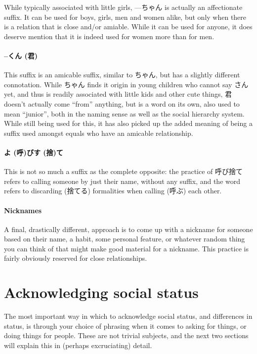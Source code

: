\documentclass[11pt, b5paper, twoside, openright, onecolumn]{book}
\makeatletter
\newcommand*{\rubystack}[2]{{\relscale{0.5}%
  \begin{tabular}[b]{@{}c@{}}%
    {#1}\\%
   {\textscale{2}{#2}}%
  \end{tabular}}%
}
\DeclareRobustCommand*{\ruby}[2]{%
  \mbox{%
    \setlength{\parskip}{0ex}%
    \BeginAccSupp{method=pdfstringdef,ActualText={#1}}%
      \rubystack{\phantom{#2}}{#1}%
      \llap{%
        \rubystack{#2}{\phantom{#1}}%
      }%
    \EndAccSupp{}%
  }%
}
\renewcommand*{\ruby}[2]{#2 (#1)}%
\makeatother
\begin{document}
While typically associated with little girls‚ —ちゃん is actually an affectionate suffix. It can be used for boys‚ girls‚ men and women alike‚ but only when there is a relation that is close and/or amiable. While it  can be used for anyone‚ it does deserve mention that it is indeed used for women more than for men.

\paragraph{–\ruby{君}{くん}}

This suffix is an amicable suffix‚ similar to ちゃん‚ but has a slightly different connotation. While ちゃん finds it origin in young children who cannot say さん yet‚ and thus is readily associated with little kids and other cute things‚ 君 doesn’t actually come “from” anything‚ but is a word on its own‚ also used to mean “junior”‚ both in the naming sense as well as the social hierarchy system. While still being used for this‚ it has also picked up the added meaning of being a suffix used amongst equals who have an amicable relationship.

\paragraph{\ruby{呼}{よ}び\ruby{捨}{す}て}

This is not so much a suffix as the complete opposite: the practice of 呼び捨て refers to calling someone by just their name‚ without any suffix‚ and the word refers to discarding (捨てる) formalities when calling (呼ぶ) each other.

\paragraph{Nicknames}

A final‚ drastically different‚ approach is to come up with a nickname for someone based on their name‚ a habit‚ some personal feature‚ or whatever random thing you can think of that might make good material for a nickname. This practice is fairly obviously reserved for close relationships.

\section{Acknowledging social status}

The most important way in which to acknowledge social status‚ and differences in status‚ is through your choice of phrasing when it comes to asking for things‚ or doing things for people. These are not trivial subjects‚ and the next two sections will explain this in (perhaps excruciating) detail.
\end{document}
